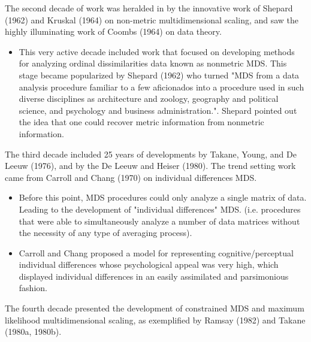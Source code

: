 \documentclass[11pt]{report}
\begin{document}
\indent The second decade of work was heralded in by the innovative work of 
Shepard (1962)\cite{Shepard1962} and Kruskal (1964)\cite{Kruskal1964} on 
non-metric multidimensional scaling, and saw the highly illuminating work of 
Coombs (1964)\cite{coombs} on data theory. 

\begin{itemize}
\item This very active decade included work that focused on developing methods 
for analyzing ordinal dissimilarities data known as nonmetric MDS. This stage 
became popularized by Shepard (1962)\cite{Shepard1962} who turned "MDS from a 
data analysis procedure familiar to a few aficionados into a procedure used in 
such diverse disciplines as architecture and zoology, geography and political 
science, and psychology and business administration.". Shepard pointed out the 
idea that one could recover metric information from nonmetric information.
\end{itemize}

\indent The third decade included 25 years of developments by Takane, Young, 
and De Leeuw (1976)\cite{takane}, and by the De Leeuw and Heiser (1980)\cite{de_leeuw}. 
The trend setting work came from Carroll and Chang (1970)\cite{Carroll1970} on individual 
differences MDS. 

\begin{itemize}
\item Before this point, MDS procedures could only analyze a single matrix of 
data. Leading to the development of "individual differences"  MDS. (i.e. 
procedures that were able to simultaneously analyze a number of data matrices 
without the necessity of any type of averaging process). 

\item Carroll and Chang proposed a model for representing cognitive/perceptual 
individual differences whose psychological appeal was very high, which displayed 
individual differences in an easily assimilated and parsimonious fashion.
\end{itemize}

\indent  The fourth decade presented the development of constrained MDS and 
maximum likelihood multidimensional scaling, as exemplified by Ramsay (1982) and 
Takane (1980a, 1980b)\cite{takane}. 
\end{document}
